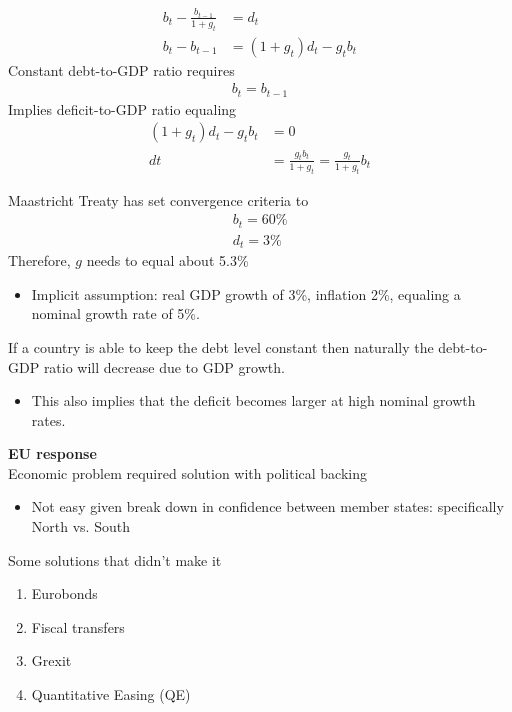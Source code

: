 \documentclass{beamer}
\begin{document}
\begin{frame}
  \begin{align}
    b_t-\frac{b_{t-1}}{1+g_t} &= d_t\\ \nonumber
  b_t-b_{t-1} &= (1+g_t)d_t-g_tb_t  
  \end{align}
  \medskip
  Constant debt-to-GDP ratio requires
  \begin{align}
    b_t=b_{t-1}
  \end{align}
  \medskip Implies deficit-to-GDP ratio equaling 
\begin{align}
  (1+g_t)d_t-g_tb_t &=0 \\ \nonumber
  dt &= \frac{g_tb_t}{1+g_t} = \frac{g_t}{1+g_t}b_t
\end{align}
\end{frame}


\begin{frame}
  Maastricht Treaty has set convergence criteria to
  \begin{align*}
    b_t=60\%\\
    d_t=3\%
  \end{align*}
  \medskip
  Therefore, $g$ needs to equal about 5.3\%
   \begin{itemize}
     \item Implicit assumption: real GDP growth of 3\%, inflation  2\%, equaling a nominal growth rate of 5\%.  
   \end{itemize} 
   \medskip
   If a country is able to keep the debt level constant then naturally the debt-to-GDP ratio will decrease due to GDP growth. 
   \begin{itemize}
     \item This also implies that the deficit becomes larger at high nominal growth rates.  
   \end{itemize}
\end{frame}


\begin{frame}
  \textbf{EU response}\\
  Economic problem required solution with political backing
  \begin{itemize}
    \item Not easy given break down in confidence between member states: specifically North vs. South    
  \end{itemize}
  \medskip
  Some solutions that didn't make it
  \begin{enumerate}
    \item Eurobonds
    \item Fiscal transfers
    \item Grexit
    \item Quantitative Easing (QE)
  \end{enumerate}
 \end{frame}
\end{document}
